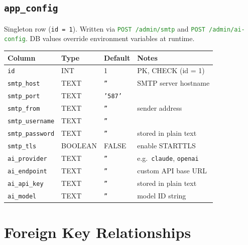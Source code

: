 \documentclass[12pt,a4paper,twoside]{report}
\newcommand{\code}[1]{\texttt{#1}}
\newcommand{\route}[1]{\texttt{\textcolor{ForestGreen}{#1}}}
\begin{document}
\subsection*{\texttt{app\_config}}

Singleton row (\code{id = 1}).  Written via \route{POST /admin/smtp}
and \route{POST /admin/ai-config}.  DB values override environment
variables at runtime.

\begin{table}[H]
  \centering\small
  \begin{tabular}{@{}llll@{}}
    \toprule
    \textbf{Column} & \textbf{Type} & \textbf{Default} & \textbf{Notes} \\
    \midrule
    \code{id}           & INT     & 1        & PK, CHECK (id = 1) \\
    \code{smtp\_host}   & TEXT    & \code{''} & SMTP server hostname \\
    \code{smtp\_port}   & TEXT    & \code{'587'} & \\
    \code{smtp\_from}   & TEXT    & \code{''} & sender address \\
    \code{smtp\_username}& TEXT   & \code{''} & \\
    \code{smtp\_password}& TEXT   & \code{''} & stored in plain text \\
    \code{smtp\_tls}    & BOOLEAN & FALSE    & enable STARTTLS \\
    \code{ai\_provider} & TEXT    & \code{''} & e.g.\ \code{claude}, \code{openai} \\
    \code{ai\_endpoint} & TEXT    & \code{''} & custom API base URL \\
    \code{ai\_api\_key} & TEXT    & \code{''} & stored in plain text \\
    \code{ai\_model}    & TEXT    & \code{''} & model ID string \\
    \bottomrule
  \end{tabular}
\end{table}

\section{Foreign Key Relationships}
\label{sec:schema-fk}
\end{document}
